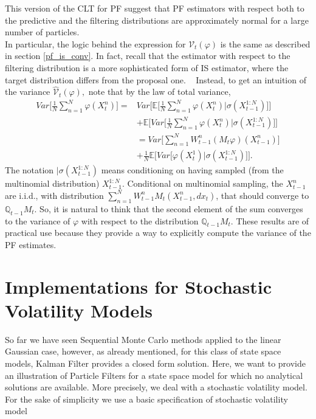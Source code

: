 \documentclass[
]{book}
\theoremstyle{break}
\theoremstyle{nonumberplain}
\begin{document}
This version of the CLT for PF suggest that PF estimators with respect
both to the predictive and the filtering distributions are approximately
normal for a large number of particles.\\
In particular, the logic behind the expression for
\(\mathcal{V}_t(\varphi)\) is the same as described in section
\ref{pf_is_conv}. In fact, recall that the estimator with respect to the
filtering distribution is a more sophisticated form of IS estimator,
where the target distribution differs from the proposal one. ~ Instead,
to get an intuition of the variance \(\hat{\mathcal{V}}_t(\varphi),\)
note that by the law of total variance, \begin{equation*}
    \begin{split}
        Var\Bigg[ \frac{1}{N}  \sum\limits_{n=1}^N \varphi(X_t^n) \Bigg] = &Var\Bigg[ \mathbb E\bigg[\frac{1}{N}  \sum\limits_{n=1}^N \varphi(X_t^n)\Big| \sigma(X_{t-1}^{1:N}) \bigg] \Bigg] \\
        &+ \mathbb E\Bigg[ Var\bigg[ \frac{1}{N}  \sum\limits_{n=1}^N \varphi(X_t^n)    \Big| \sigma(X_{t-1}^{1:N})\bigg]\Bigg] \\
        &= Var\bigg[\sum\limits_{n=1}^N W_{t-1}^n (M_t\varphi)(X_{t-1}^n)\bigg] \\
        &+\frac{1}{N}\mathbb E\Bigg[Var\bigg[\varphi(X_t^1) \Big| \sigma(X_{t-1}^{1:N})\bigg]\Bigg].
    \end{split}
\end{equation*} The notation \(\mid \sigma(X_{t-1}^{1:N})\) means
conditioning on having sampled (from the multinomial distribution)
\(X_{t-1}^{1:N}\). Conditional on multinomial sampling, the
\(X_{t-1}^n\) are i.i.d., with distribution
\(\sum\limits_{n=1}^N W_{t-1}^n M_t(X_{t-1}^n, dx_t)\), that should
converge to \(\mathbb Q_{t-1}M_t\). So, it is natural to think that the
second element of the sum converges to the variance of \(\varphi\) with
respect to the distribution \(\mathbb Q_{t-1}M_t\). These results are of
practical use because they provide a way to explicitly compute the
variance of the PF estimates.

\section{Implementations for Stochastic Volatility Models}

So far we have seen Sequential Monte Carlo methods applied to the linear
Gaussian case, however, as already mentioned, for this class of state
space models, Kalman Filter provides a closed form solution. Here, we
want to provide an illustration of Particle Filters for a state space
model for which no analytical solutions are available. More precisely,
we deal with a stochastic volatility model. For the sake of simplicity
we use a basic specification of stochastic volatility model
\end{document}
